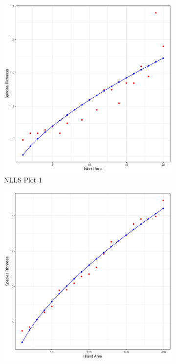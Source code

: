 \documentclass{article}
\begin{document}
\begin{figure}[h!]
  \centering
  \begin{subfigure}[b]{0.3\linewidth}
    \includegraphics[width=\linewidth]{../../Results/Simulation/NLLS/Plot_1.pdf}
     \caption{NLLS Plot 1}
  \end{subfigure}
  \begin{subfigure}[b]{0.3\linewidth}
    \includegraphics[width=\linewidth]{../../Results/Simulation/NLLS/Plot_190.pdf}

\end{subfigure}
\end{figure}
\end{document}
